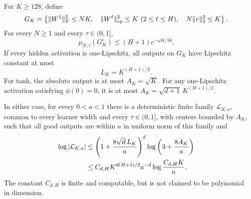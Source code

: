 \begin{lemma}
\label{lem:lipschitz-output-cover}
For $K\geq128$, define
\begin{equation}
 G_K=\left\{\|W^1\|_F^2\leq NK,\quad
       \|W^\ell\|_{\rm op}^2\leq K\ (2\leq\ell\leq H),\quad
       N\|v\|_2^2\leq K\right\}.
 \label{eq:lipschitz-norm-event}
\end{equation}
For every $N\geq1$ and every $\tau\in(0,1]$,
\begin{equation}
 \mu_{N,\tau}(G_K^c)\leq(H+1)e^{-\omega K/16}.
 \label{eq:lipschitz-prior-tail}
\end{equation}
If every hidden activation is one-Lipschitz, all outputs on $G_K$
have Lipschitz constant at most
\[
 L_K=K^{(H+1)/2}.
\]
For tanh, the absolute output is at most $A_K=\sqrt K$.
For any one-Lipschitz activation satisfying $\phi(0)=0$, it is at
most $A_K=\sqrt{d+1}\,K^{(H+1)/2}$.

In either case, for every $0<a<1$ there is a deterministic finite
family $\mathcal L_{K,a}$, common to every learner width and every
$\tau\in(0,1]$, with centers bounded by $A_K$, such that all good
outputs are within $a$ in uniform norm of this family and
\begin{align}
 \log|\mathcal L_{K,a}|
 &\leq\left(1+\frac{8\sqrt d\,L_K}{a}\right)^d
                    \log\left(3+\frac{8A_K}{a}\right)\notag\\
 &\leq C_{d,H}K^{d(H+1)/2}a^{-d}
                     \log\frac{C_{d,H}K}{a}.
 \label{eq:lipschitz-output-cover}
\end{align}
The constant $C_{d,H}$ is finite and computable, but is not claimed
to be polynomial in dimension.
\end{lemma}
